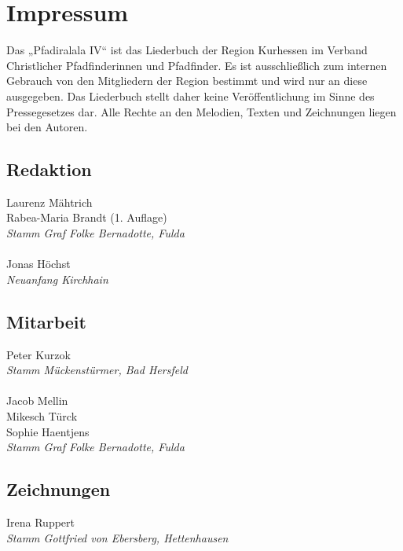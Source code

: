\section*{Impressum}

\vspace{10pt} Das „Pfadiralala IV“ ist das Liederbuch der Region Kurhessen im Verband Christlicher Pfadfinderinnen und Pfadfinder. Es ist ausschließlich zum internen Gebrauch von den Mitgliedern der Region bestimmt und wird nur an diese ausgegeben. Das Liederbuch stellt daher keine Veröffentlichung im Sinne des Pressegesetzes dar. Alle Rechte an den Melodien, Texten und Zeichnungen liegen bei den Autoren. \\ \vspace{10pt} 

\begin{centering}
\begin{multicols}{2}

\subsection*{Redaktion}
Laurenz Mähtrich \\ Rabea-Maria Brandt (1. Auflage) \\ \textit{Stamm Graf Folke Bernadotte, Fulda} \\ ~\\
Jonas Höchst \\ \textit{Neuanfang Kirchhain} \\

\subsection*{Mitarbeit}
Peter Kurzok \\ \textit{Stamm Mückenstürmer, Bad Hersfeld} \\ ~\\
Jacob Mellin \\ Mikesch Türck \\ Sophie Haentjens \\ \textit{Stamm Graf Folke Bernadotte, Fulda} \\

\columnbreak

\subsection*{Zeichnungen}
Irena Ruppert \\ \textit{Stamm Gottfried von Ebersberg, Hettenhausen} \\ ~\\


\end{multicols}
\end{centering}
